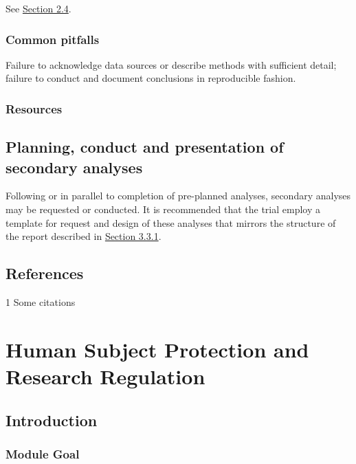 \documentclass[]{book}
\begin{document}
See
\protect\hyperlink{special-considerations-for-older-adults-1}{Section
2.4}.

\subsection{Common pitfalls}\label{common-pitfalls-2}

Failure to acknowledge data sources or describe methods with sufficient
detail; failure to conduct and document conclusions in reproducible
fashion.

\subsection{Resources}\label{resources-2}

\section{Planning, conduct and presentation of secondary
analyses}\label{planning-conduct-and-presentation-of-secondary-analyses}

Following or in parallel to completion of pre-planned analyses,
secondary analyses may be requested or conducted. It is recommended that
the trial employ a template for request and design of these analyses
that mirrors the structure of the report described in
\protect\hyperlink{contents-of-the-document-1}{Section 3.3.1}.

\section{References}\label{references}

1 Some citations

\chapter{Human Subject Protection and Research
Regulation}\label{human-subject-protection-and-research-regulation}

\section{Introduction}\label{introduction-2}

\subsection{Module Goal}\label{module-goal}
\end{document}
